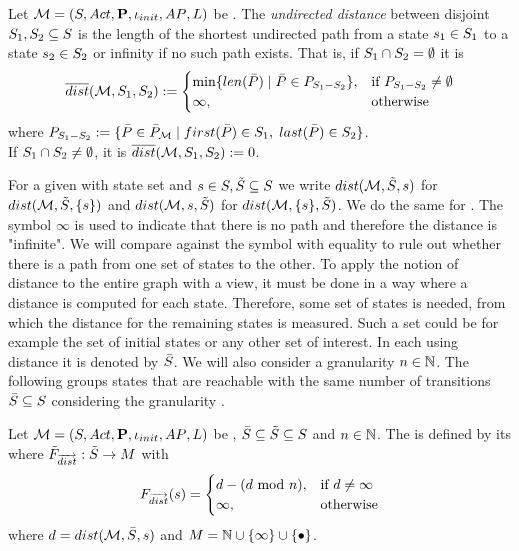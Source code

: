 \documentclass[preview]{standalone}
\begin{document}
\begin{definition}
	Let ${{{\mathcal{M}}}} = {{({S}, {Act}, {\textbf{P}}, {\iota_{init}}, {AP}, {L})}}$ be \achgphN. The \emph{undirected distance} between disjoint ${S}_1, {S}_2 \subseteq {S}$ is the length of the shortest undirected path from a state ${s}_1 \in {S}_1$ to a state ${s}_2 \in {S}_2$ or infinity if no such path exists. That is, if ${S}_1 \cap {S}_2 = \emptyset$ it is		
	\[
	{\overline{dist}}({{{\mathcal{M}}}}, {S}_1, {S}_2) := 
	\begin{cases}
		\min\{{len}({\bar{{P}}}) \mid {\bar{\ensuremath{{P}}}} \in P_{{S}_1 - {S}_2}\}, &\text{if } P_{{S}_1 - {S}_2} \neq \emptyset \\
		\infty, &\text{otherwise}
	\end{cases}
	\]
	where $P_{\states_1 - \states_2} := \{\pathbi \in \pathbiset \mid \pfirst(\pathbi) \in \states_1, \; \plast(\pathbi) \in \states_2\}$. \\
	\noindent
	If ${S}_1 \cap {S}_2 \neq \emptyset$, it is ${\overline{dist}}({{{\mathcal{M}}}}, {S}_1, {S}_2) := 0$.
\end{definition}

For a given \chgphN \chgph with state set \states and ${s} \in {S}, {\tilde{{S}}} \subseteq {S}$ we write ${dist}({{\mathcal{M}}}, {\tilde{{S}}}, {s})$ for ${dist}({{\mathcal{M}}}, {\tilde{{S}}}, \{{s}\})$ and ${dist}({{\mathcal{M}}}, {s}, {\tilde{{S}}})$ for ${dist}({{\mathcal{M}}}, \{{s}\}, {\tilde{{S}}})$. We do the same for \distpathbi. The symbol $\infty$ is used to indicate that there is no path and therefore the distance is "infinite". We will compare against the symbol with equality to rule out whether there is a path from one set of states to the other.
To apply the notion of distance to the entire \mdpN graph with a view, it must be done in a way where a distance is computed for each state. Therefore, some set of states is needed, from which the distance for the remaining states is measured. Such a set could be for example the set of initial states or any other set of interest. In each \viewN using distance it is denoted by $\bar{{S}}$. We will also consider a granularity ${n} \in {\mathbb{N}}$. The following \viewN groups states that are reachable with the same number of transitions $\bar{{S}} \subseteq {S}$ considering the granularity \grandist.

\begin{definition}
		Let ${{{\mathcal{M}}}} = {{({S}, {Act}, {\textbf{P}}, {\iota_{init}}, {AP}, {L})}}$ be \achgphN, $\bar{{S}} \subseteq {\tilde{\ensuremath{{S}}}} \subseteq {S}$ and $n \in {\mathbb{N}}$. The \viewN \viewdistance is defined by its \grpfctN \gfctdistance where ${{\tilde{F}_{{\overrightarrow{{dist}}}}}} : {\tilde{{S}}} \to {\ensuremath{{M}}}$ with 
		\[
		{{F_{{\overrightarrow{{dist}}}}}}({s}) =
		\begin{cases}
			 {d} - ({d} \text{ mod } n), &\text{if } d \neq \infty \\
			 \infty, &\text{otherwise}
		\end{cases}		
		\]
		where ${d} = {dist}({{{\mathcal{M}}}},\bar{{S}}, {s})$ and $\imggrp = \natnums \cup \{\infty\} \cup \remset$.
\end{definition}
\end{document}

